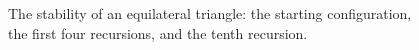 \documentclass[12pt]{article}
\begin{document}
\begin{figure}[h!]
\begin{center}
  \parbox{110mm}{\caption{\label{triang} The stability of an
  equilateral triangle: the starting configuration, the first four
  recursions, and the tenth recursion.}}
\end{center}
\end{figure}
\end{document}
